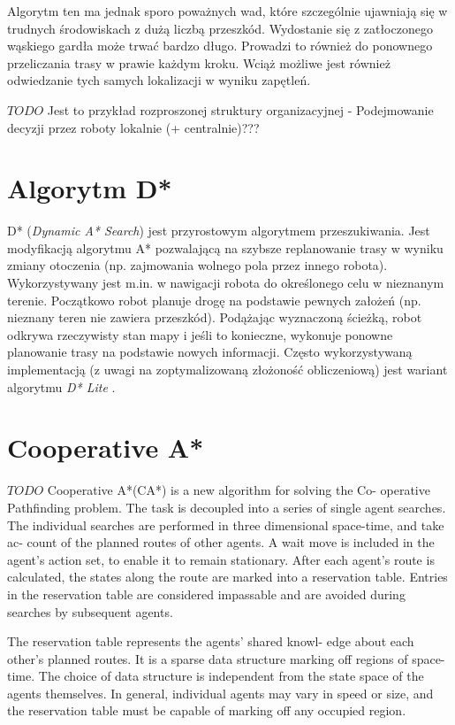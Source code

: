 Algorytm ten ma jednak sporo poważnych wad, które szczególnie ujawniają się w trudnych środowiskach z dużą liczbą przeszkód. Wydostanie się z zatłoczonego wąskiego gardła może trwać bardzo długo. Prowadzi to również do ponownego przeliczania trasy w prawie każdym kroku. Wciąż możliwe jest również odwiedzanie tych samych lokalizacji w wyniku zapętleń.

$TODO$ Jest to przykład rozproszonej struktury organizacyjnej - Podejmowanie decyzji przez roboty lokalnie (+ centralnie)???

\section{Algorytm D*}
D* ({\it Dynamic A* Search}) jest przyrostowym algorytmem przeszukiwania. Jest modyfikacją algorytmu A* pozwalającą na szybsze replanowanie trasy w wyniku zmiany otoczenia (np. zajmowania wolnego pola przez innego robota). Wykorzystywany jest m.in. w nawigacji robota do określonego celu w nieznanym terenie. Początkowo robot planuje drogę na podstawie pewnych założeń (np. nieznany teren nie zawiera przeszkód). Podążając wyznaczoną ścieżką, robot odkrywa rzeczywisty stan mapy i jeśli to konieczne, wykonuje ponowne planowanie trasy na podstawie nowych informacji.
Często wykorzystywaną implementacją (z uwagi na zoptymalizowaną złożoność obliczeniową) jest wariant algorytmu {\it D* Lite} \cite{dstarlite}.

\section{Cooperative A*}
$TODO$
Cooperative A*(CA*) is a new algorithm for solving the Co-
operative Pathfinding problem. The task is decoupled into
a series of single agent searches. The individual searches
are performed in three dimensional space-time, and take ac-
count of the planned routes of other agents. A wait move
is included in the agent’s action set, to enable it to remain
stationary. After each agent’s route is calculated, the states
along the route are marked into a reservation table. Entries
in the reservation table are considered impassable and are
avoided during searches by subsequent agents.

The reservation table represents the agents’ shared knowl-
edge about each other’s planned routes. It is a sparse data
structure marking off regions of space-time. The choice
of data structure is independent from the state space of the
agents themselves. In general, individual agents may vary in
speed or size, and the reservation table must be capable of
marking off any occupied region.

